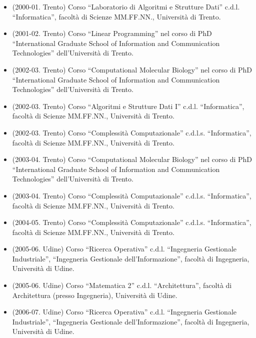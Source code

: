 \documentclass[11pt]{article}
\begin{document}
\begin{itemize}

\item (2000-01. Trento) Corso 
``Laboratorio di Algoritmi e Strutture Dati''
c.d.l. ``Informatica'', 
facolt\`a di Scienze MM.FF.NN., Universit\`a di Trento. 

\item (2001-02. Trento) Corso 
``Linear Programming'' 
nel corso di PhD ``International Graduate School of Information and Communication Technologies''
dell'Universit\`a di Trento. 

\item (2002-03. Trento) Corso 
``Computational Molecular Biology'' 
nel corso di PhD ``International Graduate School of Information and Communication Technologies''
dell'Universit\`a di Trento. 

\item (2002-03. Trento) Corso 
``Algoritmi e Strutture Dati I''
c.d.l. ``Informatica'', 
facolt\`a di Scienze MM.FF.NN., Universit\`a di Trento. 

\item (2002-03. Trento) Corso 
``Complessit\`a Computazionale''
c.d.l.s. ``Informatica'', 
facolt\`a di Scienze MM.FF.NN., Universit\`a di Trento. 

\item (2003-04. Trento) Corso 
``Computational Molecular Biology'' 
nel corso di PhD ``International Graduate School of Information and Communication Technologies''
dell'Universit\`a di Trento. 

\item (2003-04. Trento) Corso 
``Complessit\`a Computazionale''
c.d.l.s. ``Informatica'', 
facolt\`a di Scienze MM.FF.NN., Universit\`a di Trento. 

\item (2004-05. Trento) Corso 
``Complessit\`a Computazionale''
c.d.l.s. ``Informatica'', 
facolt\`a di Scienze MM.FF.NN., Universit\`a di Trento. 

\item (2005-06. Udine) Corso 
``Ricerca Operativa''
c.d.l. ``Ingegneria Gestionale Industriale'',
         ``Ingegneria Gestionale dell'Informazione'', 
facolt\`a di Ingegneria, Universit\`a di Udine. 

\item (2005-06. Udine) Corso 
``Matematica 2''
c.d.l. ``Architettura'',
facolt\`a di Architettura (presso Ingegneria), Universit\`a di Udine. 

\item (2006-07. Udine) Corso 
``Ricerca Operativa''
c.d.l. ``Ingegneria Gestionale Industriale'',
         ``Ingegneria Gestionale dell'Informazione'', 
facolt\`a di Ingegneria, Universit\`a di Udine. 


\end{itemize}
\end{document}

